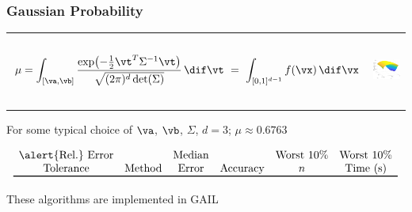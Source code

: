 \documentclass[10pt,compress,xcolor={usenames,dvipsnames},aspectratio=169]{beamer} %
\renewcommand{\mSigma}{\Sigma}
\begin{document}
\begin{frame}[label=GaussProb]
\frametitle{Gaussian Probability}
\vspace{-8ex}
\begin{tabular}{m{}m{3cm}}
	\begin{equation*}
	\mu = \int_{[\va,\vb]} \frac{\exp\bigl(- \frac 12 \vt^T \mSigma^{-1} \vt 
		\bigr)}{\sqrt{(2 
			\pi)^d \det(\mSigma)}} \, \dif \vt \
	= \ \int_{[0,1]^{d-1}} 
	f(\vx) \, 
	\dif \vx
	\end{equation*}
	& 
	\includegraphics[height = 2.3cm]{Programs/GenzFun.eps}
\end{tabular}

\vspace{-4ex}
For some typical choice of 
$\va$, $\vb$, $\mSigma$, $d=3$;  $\mu \approx 0.6763$

\vspace{-4ex}

\begin{equation*}
\begin{array}{cccccc}
\text{\alert{Rel.}\ Error} & & \text{Median}&& \text{Worst 10\%} & \text{Worst 10\%} \\
\text{Tolerance} & \text{Method}  & \text{Error} & \text{Accuracy} 
& n & \text{Time (s)} \\
\toprule

\end{array}
\end{equation*}

\vspace{-2ex}

These algorithms are implemented in GAIL
\end{frame}
\end{document}
